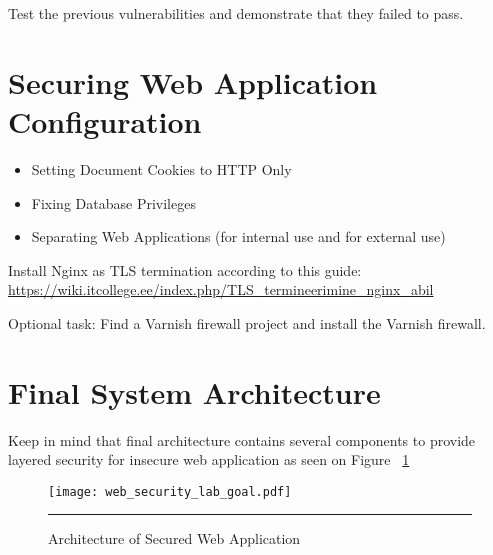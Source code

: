 
Test the previous vulnerabilities and demonstrate that they failed to pass.


\section{Securing Web Application Configuration}
\begin{itemize}
\item Setting Document Cookies to HTTP Only
\item Fixing Database Privileges
\item Separating Web Applications (for internal use and for external use)
\end{itemize}


Install Nginx as \gls{TLS} termination according to this guide:
\url{https://wiki.itcollege.ee/index.php/TLS_termineerimine_nginx_abil}

Optional task: Find a Varnish firewall project and install the Varnish firewall.

\section{Final System Architecture} 
Keep in mind that final architecture contains several components to provide layered security for insecure web application as seen on Figure ~\ref{Architecture of Secured Web Application}

\begin{figure}[H] 
 \centering 
 \texttt{[image: web\_security\_lab\_goal.pdf]}
 \rule{35em}{0.5pt} 
 \caption{Architecture of Secured Web Application} 
 \label{Architecture of Secured Web Application} 
\end{figure}


